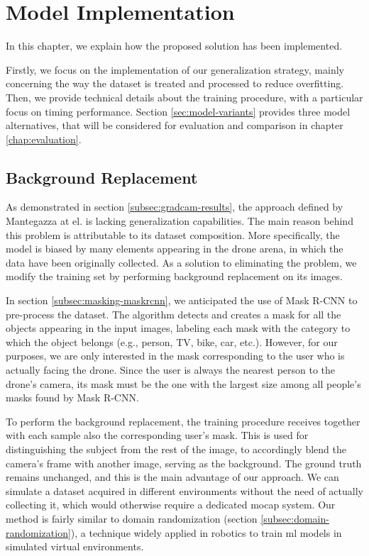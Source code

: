 \chapter{Model Implementation}
\label{chap:implementation}

In this chapter, we explain how the proposed solution has been implemented.

Firstly, we focus on the implementation of our generalization strategy, mainly concerning the way the dataset is treated and processed to reduce overfitting. Then, we provide technical details about the training procedure, with a particular focus on timing performance. Section \ref{sec:model-variants} provides three model alternatives, that will be considered for evaluation and comparison in chapter \ref{chap:evaluation}.




\section{Background Replacement}
\label{sec:implementation-bgreplace}

As demonstrated in section \ref{subsec:gradcam-results}, the approach defined by Mantegazza at el. \cite{mantegazza2019visionbased} is lacking generalization capabilities. The main reason behind this problem is attributable to its dataset composition. More specifically, the model is biased by many elements appearing in the drone arena, in which the data have been originally collected. As a solution to eliminating the problem, we modify the training set by performing background replacement on its images.

In section \ref{subsec:masking-maskrcnn}, we anticipated the use of Mask R-CNN to pre-process the dataset. The algorithm detects and creates a mask for all the objects appearing in the input images, labeling each mask with the category to which the object belongs (e.g., person, TV, bike, car, etc.). However, for our purposes, we are only interested in the mask corresponding to the user who is actually facing the drone. Since the user is always the nearest person to the drone's camera, its mask must be the one with the largest size among all people's masks found by Mask R-CNN.

To perform the background replacement, the training procedure receives together with each sample also the corresponding user's mask. This is used for distinguishing the subject from the rest of the image, to accordingly blend the camera's frame with another image, serving as the background. The ground truth remains unchanged, and this is the main advantage of our approach. We can simulate a dataset acquired in different environments without the need of actually collecting it, which would otherwise require a dedicated \gls{mocap} system. Our method is fairly similar to domain randomization (section \ref{subsec:domain-randomization}), a technique widely applied in robotics to train \gls{ml} models in simulated virtual environments.

